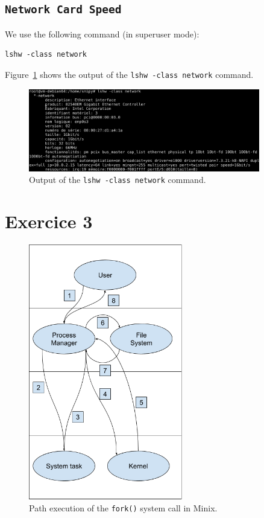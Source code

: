 \documentclass[a4paper,11pt]{report}
\begin{document}
\subsection*{\texttt{Network Card Speed}}

We use the following command (in superuser mode):

\begin{verbatim}
lshw -class network
\end{verbatim}

Figure~\ref{fig:mem} shows the output of the \verb+lshw -class network+ command.

\begin{figure}[ht]
  \centering
  \includegraphics[width=0.9\textwidth]{figures/network}
  \caption{\label{fig:mem} Output of the \texttt{lshw -class network} command.}
\end{figure}

\FloatBarrier

\section*{Exercice 3}

\begin{figure}[ht]
  \centering
  \includegraphics[width=0.6\textwidth]{figures/OS-s03-ex4}
  \caption{\label{fig:fork-path} Path execution of the \texttt{fork()} system
    call in Minix.}
\end{figure}
\end{document}
